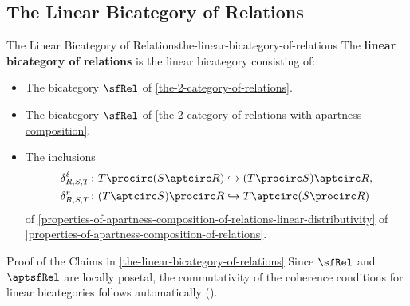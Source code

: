 \subsection{The Linear Bicategory of Relations}\label{subsection-the-linear-bicategory-of-relations}
\begin{definition}{The Linear Bicategory of Relations}{the-linear-bicategory-of-relations}%
    The \textbf{linear bicategory of relations} is the linear bicategory consisting of:
    \begin{itemize}
        \item{}The bicategory $\sfRel$ of \cref{the-2-category-of-relations}.
        \item{}The bicategory $\sfRel$ of \cref{the-2-category-of-relations-with-apartness-composition}.
        \item{}The inclusions
            \begin{align*}
                \delta^{\ell}_{R,S,T} &\colon T\procirc(S\aptcirc R)  \hookrightarrow (T\procirc S)\aptcirc R,\\
                \delta^{r}_{R,S,T}    &\colon (T\aptcirc S)\procirc R \hookrightarrow T\aptcirc(S\procirc R)
            \end{align*}
            of \cref{properties-of-apartness-composition-of-relations-linear-distributivity} of \cref{properties-of-apartness-composition-of-relations}.
    \end{itemize}
\end{definition}
\begin{Proof}{Proof of the Claims in \cref{the-linear-bicategory-of-relations}}%
    Since $\sfRel$ and $\aptsfRel$ are locally posetal, the commutativity of the coherence conditions for linear bicategories follows automatically ().
\end{Proof}
